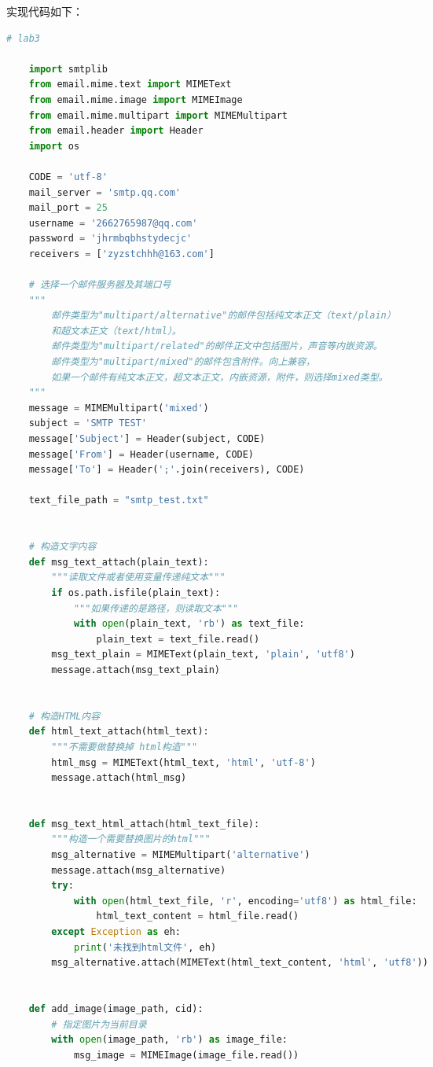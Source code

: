 \documentclass[a4paper,12pt]{report}
\begin{document}
\begin{spacing}{1.5}
实现代码如下：
\begin{spacing}{1}  
	\begin{lstlisting}[language={Python}]
    # lab3

    import smtplib
    from email.mime.text import MIMEText
    from email.mime.image import MIMEImage
    from email.mime.multipart import MIMEMultipart
    from email.header import Header
    import os
    
    CODE = 'utf-8'
    mail_server = 'smtp.qq.com'
    mail_port = 25
    username = '2662765987@qq.com'
    password = 'jhrmbqbhstydecjc'
    receivers = ['zyzstchhh@163.com']
    
    # 选择一个邮件服务器及其端口号
    """
        邮件类型为"multipart/alternative"的邮件包括纯文本正文（text/plain）
        和超文本正文（text/html）。
        邮件类型为"multipart/related"的邮件正文中包括图片，声音等内嵌资源。
        邮件类型为"multipart/mixed"的邮件包含附件。向上兼容，
        如果一个邮件有纯文本正文，超文本正文，内嵌资源，附件，则选择mixed类型。
    """
    message = MIMEMultipart('mixed')
    subject = 'SMTP TEST'
    message['Subject'] = Header(subject, CODE)
    message['From'] = Header(username, CODE)
    message['To'] = Header(';'.join(receivers), CODE)
    
    text_file_path = "smtp_test.txt"
    
    
    # 构造文字内容
    def msg_text_attach(plain_text):
        """读取文件或者使用变量传递纯文本"""
        if os.path.isfile(plain_text):
            """如果传递的是路径，则读取文本"""
            with open(plain_text, 'rb') as text_file:
                plain_text = text_file.read()
        msg_text_plain = MIMEText(plain_text, 'plain', 'utf8')
        message.attach(msg_text_plain)
    
    
    # 构造HTML内容
    def html_text_attach(html_text):
        """不需要做替换掉 html构造"""
        html_msg = MIMEText(html_text, 'html', 'utf-8')
        message.attach(html_msg)
    
    
    def msg_text_html_attach(html_text_file):
        """构造一个需要替换图片的html"""
        msg_alternative = MIMEMultipart('alternative')
        message.attach(msg_alternative)
        try:
            with open(html_text_file, 'r', encoding='utf8') as html_file:
                html_text_content = html_file.read()
        except Exception as eh:
            print('未找到html文件', eh)
        msg_alternative.attach(MIMEText(html_text_content, 'html', 'utf8'))
    
    
    def add_image(image_path, cid):
        # 指定图片为当前目录
        with open(image_path, 'rb') as image_file:
            msg_image = MIMEImage(image_file.read())
    

\end{lstlisting}
\end{spacing}
\end{spacing}
\end{document}
